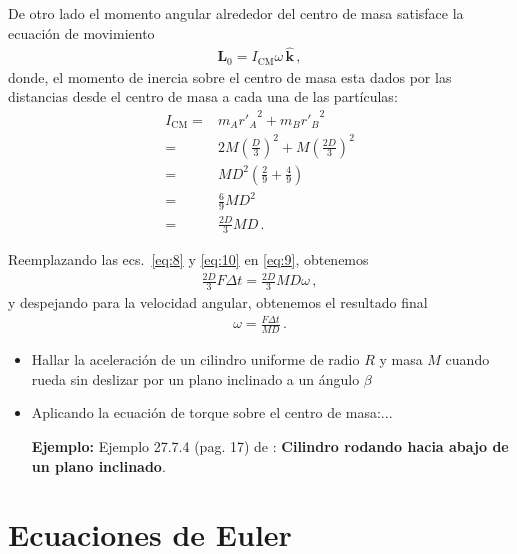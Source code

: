 \begin{itemize}
\begin{enumerate}
De otro lado el momento angular alrededor del centro de masa satisface la ecuación de movimiento
\begin{align}
  \label{eq:9}
  \mathbf{L}_0=I_{\text{CM}}\omega\,\hat{\mathbf{k}}\,,
\end{align}
donde, el momento de inercia sobre el centro de masa esta dados por las distancias desde el centro de masa a cada una de las partículas:
\begin{align}
  \label{eq:10}
  I_{\text{CM}}=&m_A {r'_{A}}^2+m_B {r'_{B}}^2\nonumber\\
  =&2M \left(\frac{D}{3}\right)^2+M\left(\frac{2D}{3}\right)^2\nonumber\\
  =&M D^2 \left(\frac{2}{9}+\frac{4}{9}\right)\nonumber\\
   =&\frac{6}{9}M D^2 \nonumber\\
   =&\frac{2D}{3}M D\,.
\end{align}

Reemplazando las ecs.~\eqref{eq:8} y \eqref{eq:10} en \eqref{eq:9}, obtenemos
\begin{align}
  \frac{2D}{3} F\Delta t=\frac{2D}{3}M D \omega\,,
\end{align}
y despejando para la velocidad angular, obtenemos el resultado final
\begin{align}
  \omega=\frac{F\Delta t}{M D}\,.
\end{align}

  \end{enumerate}

  \begin{itemize}
  \item Hallar la aceleración de un cilindro uniforme de radio $R$ y masa $M$ cuando rueda sin deslizar por un plano inclinado a un ángulo $\beta$
  \end{itemize}
  \begin{itemize}
  \item Aplicando la ecuación de torque sobre el centro de masa:...

  \end{itemize}

  \begin{itemize}
  \item[\textbf{Ejemplo:}] Ejemplo 27.7.4 (pag. 17) de \cite{mit2009}: \textbf{Cilindro rodando hacia abajo de un plano inclinado}.
  \end{itemize}
\end{itemize}

\section{Ecuaciones de Euler}


